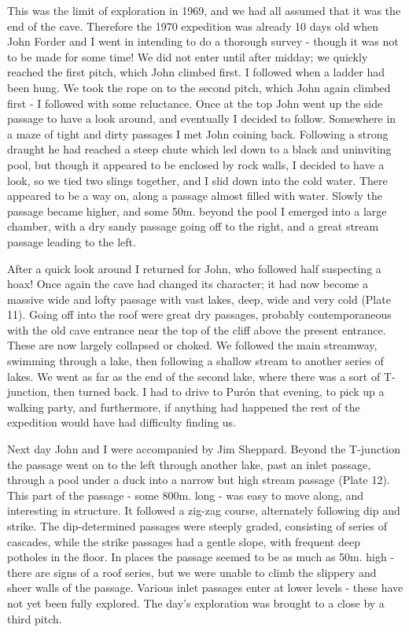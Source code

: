 \documentclass[11pt, a4paper, twoside]{memoir}
\begin{document}
This was the limit of exploration in 1969, and we had all assumed that it was the end of the cave. Therefore the 1970 expedition was already 10 days old when John Forder and I went in intending to do a thorough survey - though it was not to be made for some time! We did not enter until after midday; we quickly reached the first pitch, which John climbed first. I followed when a ladder had been hung. We took the rope on to the second pitch, which John again climbed first - I followed with some reluctance. Once at the top John went up the side passage to have a look around, and eventually I decided to follow. Somewhere in a maze of tight and dirty passages I met John coining back. Following a strong draught he had reached a steep chute which led down to a black and uninviting pool, but though it appeared to be enclosed by rock walls, I decided to have a look, so we tied two slings together, and I slid down into the cold water. There appeared to be a way on, along a passage almost filled with water. Slowly the passage became higher, and some 50m. beyond the pool I emerged into a large chamber, with a dry sandy passage going off to the right, and a great stream passage leading to the left.

After a quick look around I returned for John, who followed half suspecting a hoax! Once again the cave had changed its character; it had now become a massive wide and lofty passage with vast lakes, deep, wide and very cold (Plate 11). Going off into the roof were great dry passages, probably contemporaneous with the old cave entrance near the top of the cliff above the present entrance. These are now largely collapsed or choked. We followed the main streamway, swimming through a lake, then following a shallow stream to another series of lakes. We went as far as the end of the second lake, where there was a sort of T-junction, then turned back. I had to drive to Purón that evening, to pick up a walking party, and furthermore, if anything had happened the rest of the expedition would have had difficulty finding us.

Next day John and I were accompanied by Jim Sheppard. Beyond the T-junction the passage went on to the left through another lake, past an inlet passage, through a pool under a duck into a narrow but high stream passage (Plate 12). This part of the passage - some 800m. long - was easy to move along, and interesting in structure. It followed a zig-zag course, alternately following dip and strike. The dip-determined passages were steeply graded, consisting of series of cascades, while the strike passages had a gentle slope, with frequent deep potholes in the floor. In places the passage seemed to be as much as 50m. high - there are signs of a roof series, but we were unable to climb the slippery and sheer walls of the passage. Various inlet passages enter at lower levels - these have not yet been fully explored. The day's exploration was brought to a close by a third pitch.
\end{document}
